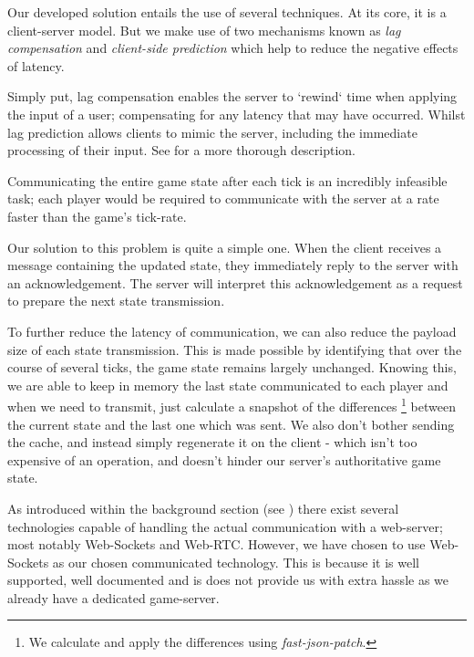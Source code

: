 \documentclass{standalone}
\begin{document}
		\label{clientPrediction}
		Our developed solution entails the use of several techniques. At its core, it is a client-server model. But we make use of two mechanisms known as \emph{lag compensation}\parencite{LagCompensation} and \emph{client-side prediction}\parencite{LagPrediction} which help to reduce the negative effects of latency.\label{sec:lagCompensation}

		Simply put, lag compensation enables the server to `rewind` time when applying the input of a user; compensating for any latency that may have occurred. Whilst lag prediction allows clients to mimic the server, including the immediate processing of their input. See \parencite{LatencyCompensating} for a more thorough description.

		Communicating the entire game state after each tick is an incredibly infeasible task; each player would be required to communicate with the server at a rate faster than the game's tick-rate.

		Our solution to this problem is quite a simple one. When the client receives a message containing the updated state, they immediately reply to the server with an acknowledgement. The server will interpret this acknowledgement as a request to prepare the next state transmission.

		To further reduce the latency of communication, we can also reduce the payload size of each state transmission. This is made possible by identifying that over the course of several ticks, the game state remains largely unchanged. Knowing this, we are able to keep in memory the last state communicated to each player and when we need to transmit, just calculate a snapshot of the differences \footnote{We calculate and apply the differences using \emph{fast-json-patch}\parencite{FastJsonPatch}.} between the current state and the last one which was sent. We also don't bother sending the cache, and instead simply regenerate it on the client - which isn't too expensive of an operation, and doesn't hinder our server's authoritative game state.

		\label{designCommunicationTechnologies}
		As introduced within the background section (see ) there exist several technologies capable of handling the actual communication with a web-server; most notably Web-Sockets and Web-RTC. However, we have chosen to use Web-Sockets as our chosen communicated technology. This is because it is well supported, well documented and is does not provide us with extra hassle as we already have a dedicated game-server.
\end{document}
